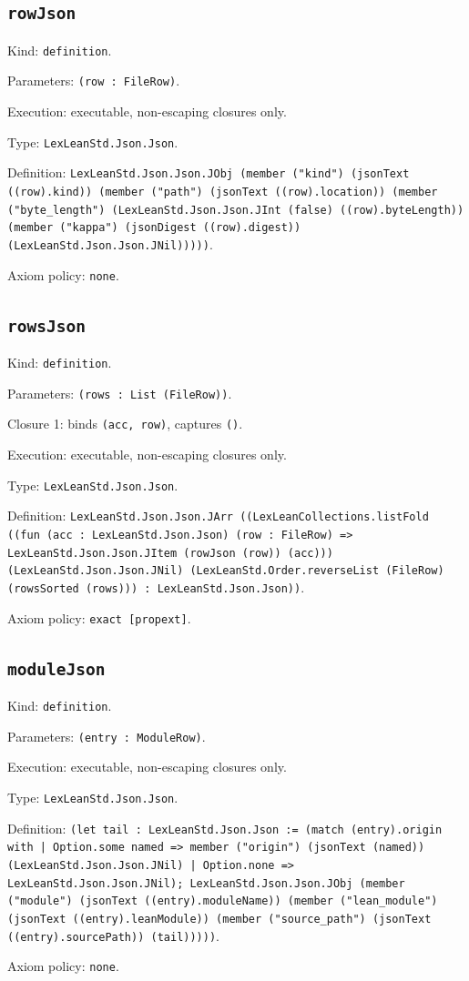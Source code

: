 \documentclass[11pt]{article}
\begin{document}
\subsection*{\texttt{rowJson}}
\noindent Kind: \texttt{definition}.\par
\noindent Parameters: \texttt{(row : FileRow)}.\par
\noindent Execution: executable, non-escaping closures only.\par
\noindent Type: \texttt{LexLeanStd.Json.Json}.\par
\noindent Definition: \texttt{LexLeanStd.Json.Json.JObj (member ("kind") (jsonText ((row).kind)) (member ("path") (jsonText ((row).location)) (member ("byte\_length") (LexLeanStd.Json.Json.JInt (false) ((row).byteLength)) (member ("kappa") (jsonDigest ((row).digest)) (LexLeanStd.Json.Json.JNil)))))}.\par
\noindent Axiom policy: \texttt{none}.\par
\subsection*{\texttt{rowsJson}}
\noindent Kind: \texttt{definition}.\par
\noindent Parameters: \texttt{(rows : List (FileRow))}.\par
\noindent Closure 1: binds \texttt{(acc, row)}, captures \texttt{()}.\par
\noindent Execution: executable, non-escaping closures only.\par
\noindent Type: \texttt{LexLeanStd.Json.Json}.\par
\noindent Definition: \texttt{LexLeanStd.Json.Json.JArr ((LexLeanCollections.listFold ((fun (acc : LexLeanStd.Json.Json) (row : FileRow) => LexLeanStd.Json.Json.JItem (rowJson (row)) (acc))) (LexLeanStd.Json.Json.JNil) (LexLeanStd.Order.reverseList (FileRow) (rowsSorted (rows))) : LexLeanStd.Json.Json))}.\par
\noindent Axiom policy: \texttt{exact [propext]}.\par
\subsection*{\texttt{moduleJson}}
\noindent Kind: \texttt{definition}.\par
\noindent Parameters: \texttt{(entry : ModuleRow)}.\par
\noindent Execution: executable, non-escaping closures only.\par
\noindent Type: \texttt{LexLeanStd.Json.Json}.\par
\noindent Definition: \texttt{(let tail : LexLeanStd.Json.Json := (match (entry).origin with | Option.some named => member ("origin") (jsonText (named)) (LexLeanStd.Json.Json.JNil) | Option.none => LexLeanStd.Json.Json.JNil); LexLeanStd.Json.Json.JObj (member ("module") (jsonText ((entry).moduleName)) (member ("lean\_module") (jsonText ((entry).leanModule)) (member ("source\_path") (jsonText ((entry).sourcePath)) (tail)))))}.\par
\noindent Axiom policy: \texttt{none}.\par
\end{document}
